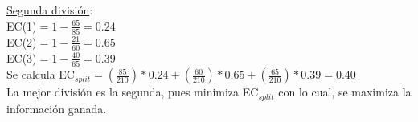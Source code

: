 \documentclass[11pt,a4paper]{report}
\begin{document}
\begin{itemize}
\underline{Segunda división}:\\

EC(1)$=1-\frac{65}{85}=0.24$\\

EC(2)$=1-\frac{21}{60}=0.65$\\

EC(3)$=1-\frac{40}{65}=0.39$\\

Se calcula EC$_{split}=(\frac{85}{210})*0.24 + (\frac{60}{210})*0.65 + (\frac{65}{210})*0.39 = 0.40$\\

La mejor división es la segunda, pues minimiza EC$_{split}$ con lo cual, se maximiza la información ganada.

\end{itemize}
\end{document}
